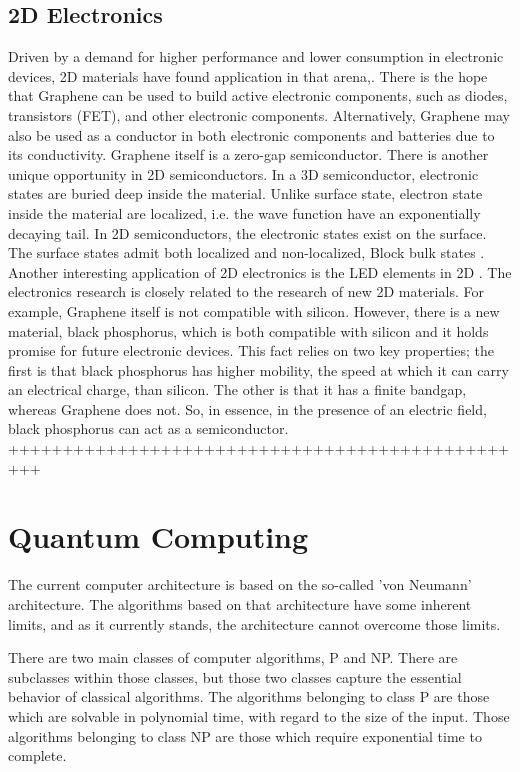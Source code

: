 \subsection*{2D Electronics}
Driven by a demand for higher performance and lower consumption in electronic devices, 2D materials have found application in that arena\cite{2DEJour1},\cite{2DEJour2}. 
There is the hope that Graphene can be used to build active electronic components, such as diodes, transistors (FET), and other electronic components. Alternatively, Graphene may also be used as a conductor in both electronic components and batteries due to its conductivity. Graphene itself is a zero-gap semiconductor. There is another unique opportunity in 2D semiconductors. In a 3D semiconductor, electronic states are buried deep inside the material. Unlike surface state, electron state inside the material are localized, i.e. the wave function have an exponentially decaying tail.
In 2D semiconductors, the electronic states exist
on the surface. The surface states admit both localized and non-localized, Block bulk states \cite{LocStates}.
Another interesting application of 2D electronics is the LED elements in 2D \cite{2DLED}. The electronics research is closely related to the research of new 2D materials. For example, Graphene itself is not compatible with silicon. However, there is a new material, black phosphorus\cite{2DPhos}, which is both compatible with silicon and it holds promise for future electronic\cite{2DPhos3} devices. This fact relies on two key properties; the first is that black phosphorus has higher mobility,
the speed at which it can carry an electrical charge, than silicon. The other is that it has a finite bandgap, whereas Graphene does not. So, in essence, in the presence of an electric field, black phosphorus can act as a semiconductor\cite{2DPhos2}.
+++++++++++++++++++++++++++++++++++++++++++++++++

\section*{Quantum Computing}

The current computer architecture is based on the so-called 'von Neumann' architecture. The algorithms based on that architecture have some inherent limits, and as it currently stands, the architecture cannot overcome those limits.

There are two main  classes of computer algorithms, P and NP. There are subclasses within those classes, but those two classes capture the essential behavior of classical algorithms. The algorithms belonging to class P are those which are solvable in polynomial time, with regard to the size of the input. Those algorithms belonging to class NP are those which require exponential time to complete\cite{PvsNP}.

